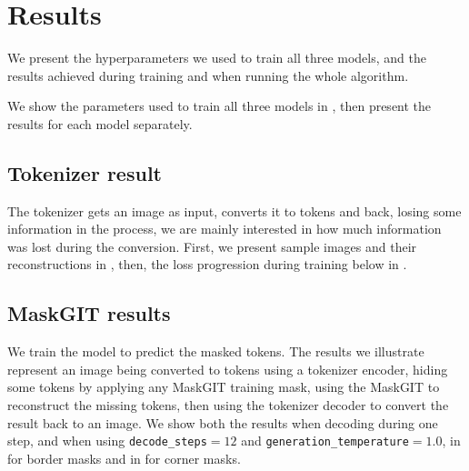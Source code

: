 \chapter{Results}


We present the hyperparameters we used to train all three models, and the results achieved during training and when running the whole algorithm.

We show the parameters used to train all three models in , then present the results for each model separately.




\section{Tokenizer result}

The tokenizer gets an image as input, converts it to tokens and back, losing some information in the process, we are mainly interested in how much information was lost during the conversion. First, we present sample images and their reconstructions in , then, the loss progression during training below in .





\section{MaskGIT results}

We train the model to predict the masked tokens. The results we illustrate represent an image being converted to tokens using a tokenizer encoder, hiding some tokens by applying any MaskGIT training mask, using the MaskGIT to reconstruct the missing tokens, then using the tokenizer decoder to convert the result back to an image. We show both the results when decoding during one step, and when using \texttt{decode\_steps}$=12$ and \texttt{generation\_temperature}$=1.0$, in  for border masks and in  for corner masks.

